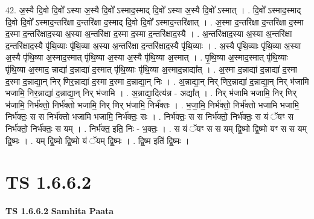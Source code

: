 \documentclass[17pt]{extarticle}
\begin{document}
42. अ॒स्यै दि॒वो दि॒वो᳚ ऽस्या अ॒स्यै दि॒वो᳚ ऽस्माद॒स्माद् दि॒वो᳚ ऽस्या अ॒स्यै दि॒वो᳚ ऽस्मात् । . दि॒वो᳚ ऽस्माद॒स्माद् दि॒वो दि॒वो᳚ ऽस्माद॒न्तरि॑क्षा द॒न्तरि॑क्षा द॒स्माद् दि॒वो दि॒वो᳚ ऽस्माद॒न्तरि॑क्षात् । . अ॒स्मा द॒न्तरि॑क्षा द॒न्तरि॑क्षा द॒स्मा द॒स्मा द॒न्तरि॑क्षाद॒स्या अ॒स्या अ॒न्तरि॑क्षा द॒स्मा द॒स्मा द॒न्तरि॑क्षाद॒स्यै । . अ॒न्तरि॑क्षाद॒स्या अ॒स्या अ॒न्तरि॑क्षा द॒न्तरि॑क्षाद॒स्यै पृ॑थि॒व्याः पृ॑थि॒व्या अ॒स्या अ॒न्तरि॑क्षा द॒न्तरि॑क्षाद॒स्यै पृ॑थि॒व्याः । . अ॒स्यै पृ॑थि॒व्याः पृ॑थि॒व्या अ॒स्या अ॒स्यै पृ॑थि॒व्या अ॒स्माद॒स्मात् पृ॑थि॒व्या अ॒स्या अ॒स्यै पृ॑थि॒व्या अ॒स्मात् । . पृ॒थि॒व्या अ॒स्माद॒स्मात् पृ॑थि॒व्याः पृ॑थि॒व्या अ॒स्माद॒ न्नाद्या॑ द॒न्नाद्या॑ द॒स्मात् पृ॑थि॒व्याः पृ॑थि॒व्या अ॒स्माद॒न्नाद्या᳚त् । . अ॒स्मा द॒न्नाद्या॑ द॒न्नाद्या॑ द॒स्मा द॒स्मा द॒न्नाद्या॒न् निर् णिर॒न्नाद्या॑ द॒स्मा द॒स्मा द॒न्नाद्या॒न् निः । . अ॒न्नाद्या॒न् निर् णिर॒न्नाद्या॑ द॒न्नाद्या॒न् निर् भ॑जामि भजामि॒ निर॒न्नाद्या॑ द॒न्नाद्या॒न् निर् भ॑जामि । . अ॒न्नाद्या॒दित्य॑न्न - अद्या᳚त् । . निर् भ॑जामि भजामि॒ निर् णिर् भ॑जामि॒ निर्भ॑क्तो॒ निर्भ॑क्तो भजामि॒ निर् णिर् भ॑जामि॒ निर्भ॑क्तः । . भ॒जा॒मि॒ निर्भ॑क्तो॒ निर्भ॑क्तो भजामि भजामि॒ निर्भ॑क्तः॒ स स निर्भ॑क्तो भजामि भजामि॒ निर्भ॑क्तः॒ सः । . निर्भ॑क्तः॒ स स निर्भ॑क्तो॒ निर्भ॑क्तः॒ स यं ॅयꣳ स निर्भ॑क्तो॒ निर्भ॑क्तः॒ स यम् । . निर्भ॑क्त॒ इति॒ निः - भ॒क्तः॒ । . स यं ॅयꣳ स स यम् द्वि॒ष्मो द्वि॒ष्मो यꣳ स स यम् द्वि॒ष्मः । . यम् द्वि॒ष्मो द्वि॒ष्मो यं ॅयम् द्वि॒ष्मः । . द्वि॒ष्म इति॑ द्वि॒ष्मः । \newline
\pagebreak
{}

\section{ TS 1.6.6.2 }

\textbf{TS 1.6.6.2 } \newline
\textbf{Samhita Paata} \newline
\end{document}
